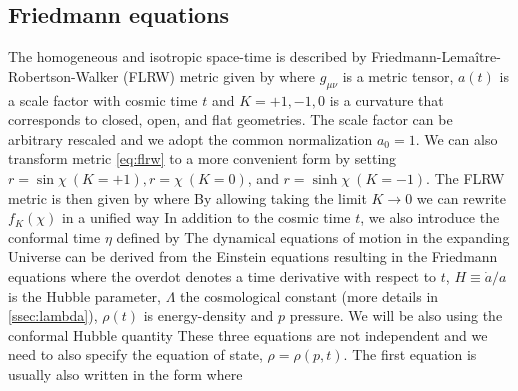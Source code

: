 \subsection{Friedmann equations}
The homogeneous and isotropic space-time is described by Friedmann-Lema\^{i}tre-Robertson-Walker (FLRW) metric given by
where $g_{\mu\nu}$ is a metric tensor, $a(t)$ is a scale factor with cosmic time $t$ and $K=+1,-1,0$ is a curvature that corresponds to closed, open, and flat geometries. The scale factor can be arbitrary rescaled and we adopt the common normalization $a_0=1$. We can also transform metric \eqref{eq:flrw} to a more convenient form by setting $r=\sin\chi\ (K=+1),r=\chi\ (K=0)$, and $r=\sinh\chi\ (K=-1)$. The FLRW metric is then given by
where
By allowing taking the limit $K\to0$ we can rewrite $f_K(\chi)$ in a unified way
In addition to the cosmic time $t$, we also introduce the conformal time $\eta$ defined by
The dynamical equations of motion in the expanding Universe can be derived from the Einstein equations resulting in the Friedmann equations
where the overdot denotes a time derivative with respect to $t$, $H\equiv\dot a/a$ is the Hubble parameter, $\Lambda$ the cosmological constant (more details in \autoref{ssec:lambda}), $\rho(t)$ is energy-density and $p$ pressure. We will be also using the conformal Hubble quantity
These three equations are not independent and we need to also specify the equation of state, $\rho=\rho(p,t)$. The first equation is usually also written in the form
where

